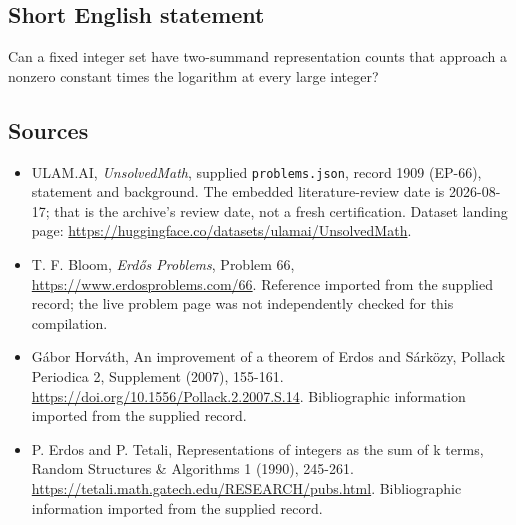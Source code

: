\documentclass[11pt,a4paper]{article}
\begin{document}
\subsection{Short English statement}

Can a fixed integer set have two-summand representation counts that approach a nonzero constant times the logarithm at every large integer?

\subsection{Sources}

{\small

\begin{itemize}

\item[\hypertarget{source:1909:1}{S1}] ULAM.AI, \emph{UnsolvedMath}, supplied \texttt{problems.json}, record 1909 (EP-66), statement and background. The embedded literature-review date is 2026-08-17; that is the archive’s review date, not a fresh certification. Dataset landing page: \url{https://huggingface.co/datasets/ulamai/UnsolvedMath}.

\item[\hypertarget{source:1909:2}{S2}] T. F. Bloom, \emph{Erdős Problems}, Problem 66, \url{https://www.erdosproblems.com/66}. Reference imported from the supplied record; the live problem page was not independently checked for this compilation.

\item[\hypertarget{source:1909:3}{S3}] Gábor Horváth, An improvement of a theorem of Erdos and Sárközy, Pollack Periodica 2, Supplement (2007), 155-161. \url{https://doi.org/10.1556/Pollack.2.2007.S.14}. Bibliographic information imported from the supplied record.

\item[\hypertarget{source:1909:4}{S4}] P. Erdos and P. Tetali, Representations of integers as the sum of k terms, Random Structures \& Algorithms 1 (1990), 245-261. \url{https://tetali.math.gatech.edu/RESEARCH/pubs.html}. Bibliographic information imported from the supplied record.

\end{itemize}

}

\label{end:1909}
\end{document}
